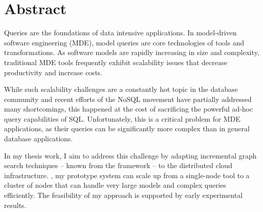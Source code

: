 % 
% 
% 
% 

\chapter*{Abstract}

Queries are the foundations of data intensive applications. In model-driven software engineering (MDE), model queries are core technologies of tools and transformations. As software models are rapidly increasing in size and complexity, traditional MDE tools frequently exhibit scalability issues that decrease productivity and increase costs.

While such scalability challenges are a constantly hot topic in the database community and recent efforts of the NoSQL movement have partially addressed many shortcomings, this happened at the cost of sacrificing the powerful ad-hoc query capabilities of SQL. Unfortunately, this is a critical problem for MDE applications, as their queries can be significantly more complex than in general database applications.

In my thesis work, I aim to address this challenge by adapting incremental graph search techniques -- known from the \eiq{} framework -- to the distributed cloud infrastructure. \iqd, my prototype system can scale up from a single-node tool to a cluster of nodes that can handle very large models and complex queries efficiently. The feasibility of my approach is supported by early experimental results.

\vfill
